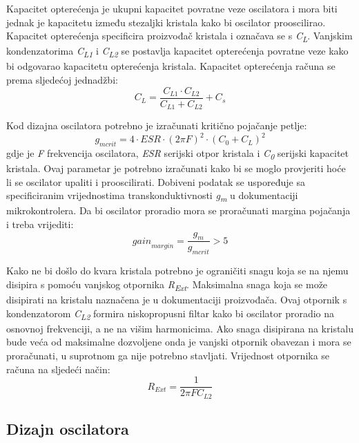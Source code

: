 Kapacitet opterećenja je ukupni kapacitet povratne veze oscilatora i mora biti jednak je kapacitetu između stezaljki kristala kako bi oscilator prooscilirao. Kapacitet opterećenja specificira proizvođač kristala i označava se s \textit{C\textsubscript{L}}. Vanjskim kondenzatorima \textit{C\textsubscript{L1}} i \textit{C\textsubscript{L2}} se postavlja kapacitet opterećenja povratne veze kako bi odgovarao kapacitetu opterećenja kristala. Kapacitet opterećenja računa se prema sljedećoj jednadžbi:
\begin{equation} \label{eq:CLOAD}
    C_L=\frac{C_{L1}\cdot C_{L2}}{C_{L1}+C_{L2}}+C_s
\end{equation}

Kod dizajna oscilatora potrebno je izračunati kritično pojačanje petlje:
\begin{equation} \label{eq:GMCRIT}
    g_{mcrit}=4\cdot ESR \cdot {(2\pi F)}^2\cdot {(C_0 + C_L)}^2
\end{equation}
gdje je \textit{F} frekvencija oscilatora, \textit{ESR} serijski otpor kristala i \textit{C\textsubscript{0}} serijski kapacitet kristala. Ovaj parametar je potrebno izračunati kako bi se moglo provjeriti hoće li se oscilator upaliti i prooscilirati. Dobiveni podatak se uspoređuje sa specificiranim vrijednostima transkonduktivnosti \textit{g\textsubscript{m}} u dokumentaciji mikrokontrolera. Da bi oscilator proradio mora se proračunati margina pojačanja i treba vrijediti:
\begin{equation} \label{eq:GMARGIN}
    {gain}_{margin}=\frac{g_m}{g_{mcrit}}>5
\end{equation}

Kako ne bi došlo do kvara kristala potrebno je ograničiti snagu koja se na njemu disipira s pomoću vanjskog otpornika \textit{R\textsubscript{Ext}}. Maksimalna snaga koja se može disipirati na kristalu naznačena je u dokumentaciji proizvođača. Ovaj otpornik s kondenzatorom \textit{C\textsubscript{L2}} formira niskopropusni filtar kako bi oscilator proradio na osnovnoj frekvenciji, a ne na višim harmonicima. Ako snaga disipirana na kristalu bude veća od maksimalne dozvoljene onda je vanjski otpornik obavezan i mora se proračunati, u suprotnom ga nije potrebno stavljati. Vrijednost otpornika se računa na sljedeći način:
\begin{equation} \label{eq:REXT}
    R_{Ext}=\frac{1}{2\pi F C_{L2}}
\end{equation}

\subsection{Dizajn oscilatora}

